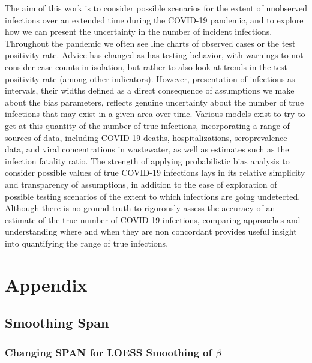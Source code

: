 \documentclass[12pt,twoside]{smiththesis}
\begin{document}
The aim of this work is to consider possible scenarios for the extent of unobserved infections over an extended time during the COVID-19 pandemic, and to explore how we can present the uncertainty in the number of incident infections. Throughout the pandemic we often see line charts of observed cases or the test positivity rate. Advice has changed as has testing behavior, with warnings to not consider case counts in isolation, but rather to also look at trends in the test positivity rate (among other indicators). However, presentation of infections as intervals, their widths defined as a direct consequence of assumptions we make about the bias parameters, reflects genuine uncertainty about the number of true infections that may exist in a given area over time.
Various models exist to try to get at this quantity of the number of true infections, incorporating a range of sources of data, including COVID-19 deaths, hospitalizations, seroprevalence data, and viral concentrations in wastewater, as well as estimates such as the infection fatality ratio.
The strength of applying probabilistic bias analysis to consider possible values of true COVID-19 infections lays in its relative simplicity and transparency of assumptions, in addition to the ease of exploration of possible testing scenarios of the extent to which infections are going undetected. Although there is no ground truth to rigorously assess the accuracy of an estimate of the true number of COVID-19 infections, comparing approaches and understanding where and when they are non concordant provides useful insight into quantifying the range of true infections.

\appendix

\hypertarget{appendix}{%
\chapter{Appendix}\label{appendix}}

\hypertarget{smoothing-span}{%
\section{Smoothing Span}\label{smoothing-span}}

\hypertarget{changing-span-for-loess-smoothing-of-beta}{%
\subsection{\texorpdfstring{Changing SPAN for LOESS Smoothing of \(\beta\)}{Changing SPAN for LOESS Smoothing of \textbackslash beta}}\label{changing-span-for-loess-smoothing-of-beta}}
\end{document}
